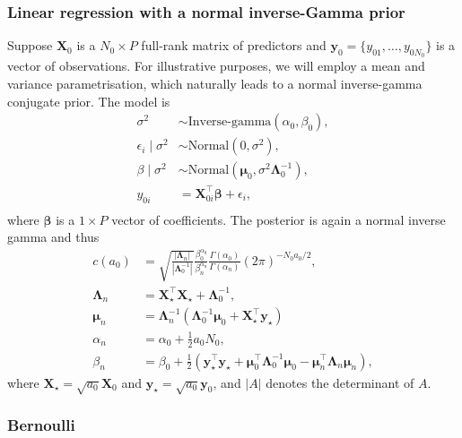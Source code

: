 \documentclass[a4paper, notitlepage, 11pt]{article}
\begin{document}
\subsubsection{Linear regression with a normal inverse-Gamma prior}

Suppose $\boldsymbol X_0$ is a $N_0 \times P$ full-rank matrix of predictors and $\boldsymbol y_0 = \{y_{01}, \ldots, y_{0N_0} \}$ is a vector of observations.
For illustrative purposes, we will employ a mean and variance parametrisation, which naturally leads to a normal inverse-gamma conjugate prior.
The model is 
\begin{align*}
 \sigma^2 &\sim \text{Inverse-gamma}(\alpha_0, \beta_0),\\
 \epsilon_i \mid \sigma^2  &\sim \text{Normal}(0, \sigma^2), \\
 \beta \mid \sigma^2 &\sim \text{Normal}(\boldsymbol \mu_0, \sigma^2\boldsymbol\Lambda_0^{-1}),\\
 y_{0i} &= \boldsymbol X_{0i}^\top \boldsymbol\beta + \epsilon_i, \\
\end{align*} 
where $\boldsymbol\beta$ is a $ 1 \times P$ vector of coefficients.
The posterior is again a normal inverse gamma and thus
\begin{align}
 \label{eq:cA0_regression}
c(a_0) &= \sqrt{\frac{|\boldsymbol\Lambda_n|}{|\boldsymbol\Lambda_0^{-1}|}} \frac{\beta_0^{\alpha_0}}{\beta_n^{\alpha_n}}\frac{\Gamma(\alpha_0)}{\Gamma(\alpha_n)}  (2\pi)^{-N_0 a_0/2},\\
\nonumber
\boldsymbol\Lambda_n &= \boldsymbol X_{\star}^\top\boldsymbol X_{\star} + \boldsymbol \Lambda_0^{-1}, \\
\nonumber
\boldsymbol\mu_n &= \boldsymbol\Lambda_n^{-1}\left(\boldsymbol\Lambda_0^{-1}\boldsymbol\mu_0 + \boldsymbol X_{\star}^\top\boldsymbol y_{\star} \right)  \\
\nonumber
\alpha_n &= \alpha_0 + \frac{1}{2}a_0N_0,\\
\nonumber
\beta_n &= \beta_0 + \frac{1}{2}\left( \boldsymbol y_{\star}^\top \boldsymbol y_{\star} + \boldsymbol \mu_0^\top \boldsymbol \Lambda_0^{-1} \boldsymbol \mu_0 - \boldsymbol\mu_n^\top \boldsymbol \Lambda_n \boldsymbol \mu_n  \right),
\end{align}
where $\boldsymbol X_{\star} = \sqrt{a_0} \boldsymbol X_0$ and $\boldsymbol y_{\star} = \sqrt{a_0} \boldsymbol y_0$, and $|A|$ denotes the determinant of $A$.

\subsubsection{Bernoulli}
\end{document}
